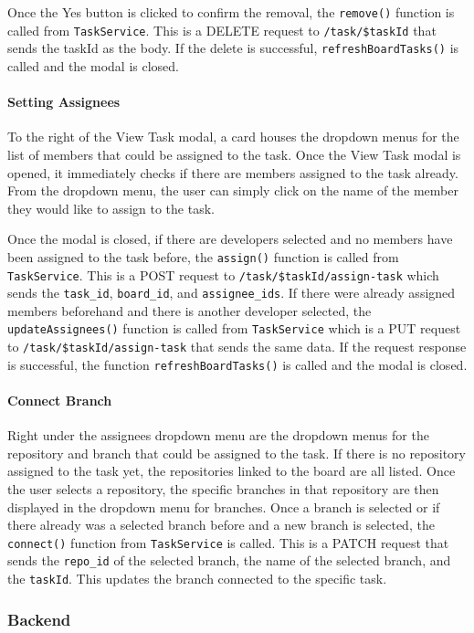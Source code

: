 \documentclass{article}
\def\code#1{\texttt{#1}}
\begin{document}
Once the Yes button is clicked to confirm the removal, the \code{remove()}
function is called from \code{TaskService}. This is a DELETE request to
\code{/task/\${taskId}} that sends the taskId as the body. If the delete is
successful, \code{refreshBoardTasks()} is called and the modal is closed.

\paragraph{Setting Assignees}
To the right of the View Task modal, a card houses the dropdown menus for the
list of members that could be assigned to the task. Once the View Task modal is
opened, it immediately checks if there are members assigned to the task already.
From the dropdown menu, the user can simply click on the name of the member they
would like to assign to the task.

Once the modal is closed, if there are developers selected and no members have
been assigned to the task before, the \code{assign()} function is called from
\code{TaskService}. This is a POST request to
\code{/task/\${taskId}/assign-task} which sends the \code{task\_id},
\code{board\_id}, and \code{assignee\_ids}. If there were already assigned
members beforehand and there is another developer selected, the
\code{updateAssignees()} function is called from \code{TaskService} which is a
PUT request to \code{/task/\${taskId}/assign-task} that sends the same data. If
the request response is successful, the function \code{refreshBoardTasks()} is
called and the modal is closed.

\paragraph{Connect Branch}
Right under the assignees dropdown menu are the dropdown menus for the
repository and branch that could be assigned to the task. If there is no
repository assigned to the task yet, the repositories linked to the board are
all listed. Once the user selects a repository, the specific branches in that
repository are then displayed in the dropdown menu for branches. Once a branch
is selected or if there already was a selected branch before and a new branch is
selected, the \code{connect()} function from \code{TaskService} is called. This
is a PATCH request that sends the \code{repo\_id} of the selected branch, the
name of the selected branch, and the \code{taskId}. This updates the branch
connected to the specific task.

\subsubsection{Backend}
\end{document}
